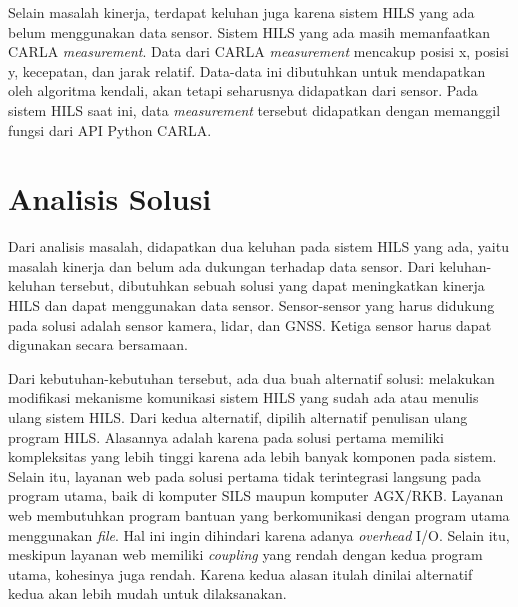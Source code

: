 Selain masalah kinerja, terdapat keluhan juga karena sistem HILS yang ada belum
menggunakan data sensor. Sistem HILS yang ada masih memanfaatkan CARLA
\textit{measurement}. Data dari CARLA \textit{measurement} mencakup posisi x,
posisi y, kecepatan, dan jarak relatif. Data-data ini dibutuhkan untuk
mendapatkan oleh algoritma kendali, akan tetapi seharusnya didapatkan dari
sensor. Pada sistem HILS saat ini, data \textit{measurement} tersebut didapatkan
dengan memanggil fungsi dari API Python CARLA.

\section{Analisis Solusi}

Dari analisis masalah, didapatkan dua keluhan pada sistem HILS yang ada, yaitu
masalah kinerja dan belum ada dukungan terhadap data sensor. Dari
keluhan-keluhan tersebut, dibutuhkan sebuah solusi yang dapat meningkatkan
kinerja HILS dan dapat menggunakan data sensor. Sensor-sensor yang harus
didukung pada solusi adalah sensor kamera, lidar, dan GNSS. Ketiga sensor harus
dapat digunakan secara bersamaan.

Dari kebutuhan-kebutuhan tersebut, ada dua buah alternatif solusi: melakukan
modifikasi mekanisme komunikasi sistem HILS yang sudah ada atau menulis ulang
sistem HILS. Dari kedua alternatif, dipilih alternatif penulisan ulang program
HILS. Alasannya adalah karena pada solusi pertama memiliki kompleksitas yang
lebih tinggi karena ada lebih banyak komponen pada sistem. Selain itu, layanan
web pada solusi pertama tidak terintegrasi langsung pada program utama, baik di
komputer SILS maupun komputer AGX/RKB. Layanan web membutuhkan program bantuan
yang berkomunikasi dengan program utama menggunakan \textit{file}. Hal ini ingin
dihindari karena adanya \textit{overhead} I/O. Selain itu, meskipun layanan web
memiliki \textit{coupling} yang rendah dengan kedua program utama, kohesinya
juga rendah. Karena kedua alasan itulah dinilai alternatif kedua akan lebih
mudah untuk dilaksanakan.

